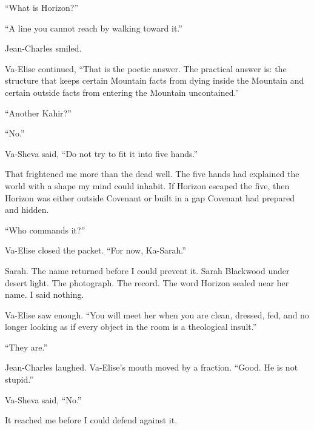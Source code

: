 ``What is Horizon?''\par

``A line you cannot reach by walking toward it.''\par

Jean-Charles smiled.\par

Va-Elise continued, ``That is the poetic answer. The practical answer is: the structure that keeps certain Mountain facts from dying inside the Mountain and certain outside facts from entering the Mountain uncontained.''\par

``Another Kahir?''\par

``No.''\par

Va-Sheva said, ``Do not try to fit it into five hands.''\par

That frightened me more than the dead well. The five hands had explained the world with a shape my mind could inhabit. If Horizon escaped the five, then Horizon was either outside Covenant or built in a gap Covenant had prepared and hidden.\par

``Who commands it?''\par

Va-Elise closed the packet. ``For now, Ka-Sarah.''\par

Sarah. The name returned before I could prevent it. Sarah Blackwood under desert light. The photograph. The record. The word Horizon sealed near her name. I said nothing.\par

Va-Elise saw enough. ``You will meet her when you are clean, dressed, fed, and no longer looking as if every object in the room is a theological insult.''\par

``They are.''\par

Jean-Charles laughed. Va-Elise's mouth moved by a fraction. ``Good. He is not stupid.''\par

Va-Sheva said, ``No.''\par

It reached me before I could defend against it.\par

\ornament

